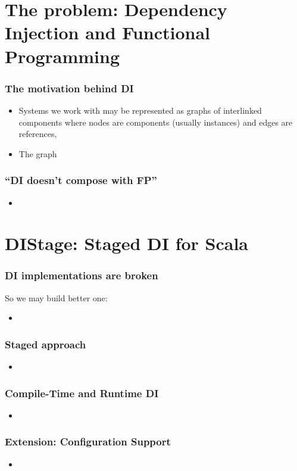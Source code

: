 \documentclass[usenames,dvipsnames]{beamer}
\begin{document}
\section{The problem: Dependency Injection and Functional Programming}

\begin{frame}
\frametitle{The motivation behind DI}
\begin{itemize}
\item Systems we work with may be represented as graphs of interlinked components where nodes are components (usually instances) and edges are references,
\item The graph 
\end{itemize}
\end{frame}

\begin{frame}
\frametitle{``DI doesn't compose with FP''}
\begin{itemize}
\item 
\end{itemize}
\end{frame}

\section{DIStage: Staged DI for Scala}

\begin{frame}
\frametitle{DI implementations are broken}
So we may build better one:
\begin{itemize}
\item 
\end{itemize}
\end{frame}

\begin{frame}
\frametitle{Staged approach}
\begin{itemize}
\item 
\end{itemize}
\end{frame}

\begin{frame}
\frametitle{Compile-Time and Runtime DI}
\begin{itemize}
\item 
\end{itemize}
\end{frame}

\begin{frame}
\frametitle{Extension: Configuration Support}
\begin{itemize}
\item 
\end{itemize}
\end{frame}
\end{document}
